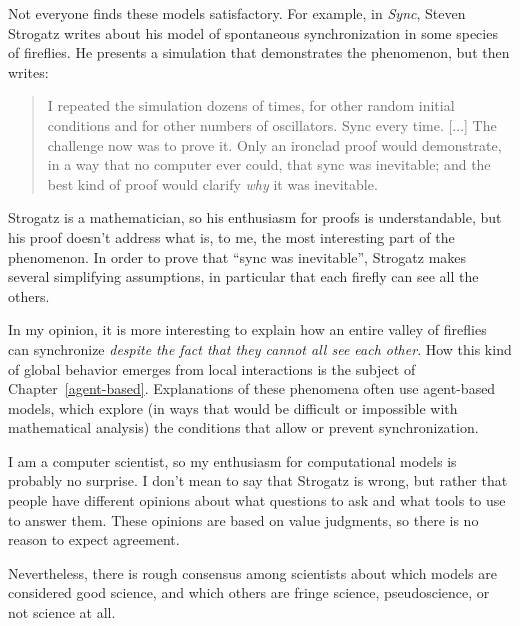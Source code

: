 \documentclass[12pt]{book}
\theoremstyle{exercise}
\begin{document}
Not everyone finds these models satisfactory.  For example, in
{\em Sync}, Steven Strogatz writes about his model of spontaneous
synchronization in some species of fireflies.  He presents a
simulation that demonstrates the phenomenon, but then writes:


\begin{quote}
I repeated the simulation dozens of times, for other random
initial conditions and for other numbers of oscillators.  Sync
every time. [...] The challenge now was to prove it.  Only an
ironclad proof would demonstrate, in a way that no computer ever
could, that sync was inevitable; and the best kind of proof would
clarify {\em why} it was inevitable.
\end{quote}

Strogatz is a mathematician, so his enthusiasm for proofs is
understandable, but his proof doesn't address what is, to me, the
most interesting part of the phenomenon.  In order to prove that ``sync
was inevitable'', Strogatz makes several simplifying assumptions, in
particular that each firefly can see all the others.


In my opinion, it is more interesting to explain how an entire valley
of fireflies can synchronize {\em despite the fact that they cannot
  all see each other}.  How this kind of global behavior emerges from
local interactions is the subject of Chapter~\ref{agent-based}.
Explanations of these phenomena often use agent-based models, which
explore (in ways that would be difficult or impossible with
mathematical analysis) the conditions that allow or prevent
synchronization.

I am a computer scientist, so my enthusiasm for computational models
is probably no surprise.  I don't mean to say that Strogatz is wrong,
but rather that people have different opinions about what questions to
ask and what tools to use to answer them.  These opinions are based
on value judgments, so there is no reason to expect agreement.


Nevertheless, there is rough consensus among scientists
about which models are considered good science, and which others
are fringe science, pseudoscience, or not science at all.

\end{document}
